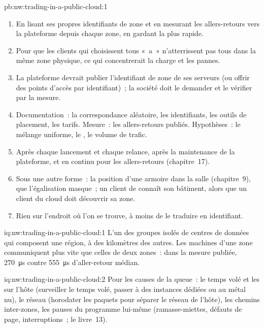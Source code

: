 \begin{solution}{pb:nw:trading-in-a-public-cloud:1}
\begin{enumerate}[resume]
  $(1 - 1/n)(t_c - t_s)$ par aller-retour en moyenne, soit \qty{237.5}{\micro\second} avec six zones et les médianes publiées.
\item En lisant ses propres identifiants de zone et en mesurant les allers-retours vers la plateforme depuis chaque zone, en gardant la plus rapide.
\item Pour que les clients qui choisissent tous «~a~» n'atterrissent pas tous dans la même zone physique, ce qui concentrerait la charge et les pannes.
\item La plateforme devrait publier l'identifiant de zone de ses serveurs (ou offrir des points d'accès par identifiant)~; la société doit le demander et le vérifier par la
  mesure.
\item Documentation~: la correspondance aléatoire, les identifiants, les outils de placement, les tarifs. Mesure~: les allers-retours publiés. Hypothèses~: le
  mélange uniforme, le , le volume de trafic.
\item Après chaque lancement et chaque relance, après la maintenance de la plateforme, et en continu pour les allers-retours (chapitre~17).
\item Sous une autre forme~: la position d'une armoire dans la salle (chapitre~9), que l'égalisation masque~; un client de  connaît son bâtiment, alors que
  un client du cloud doit découvrir sa zone.
\item Rien sur l'endroit où l'on se trouve, à moins de le traduire en identifiant.
\end{enumerate}
\end{solution}

\begin{solution}{iq:nw:trading-in-a-public-cloud:1}
L'un des groupes isolés de centres de données qui composent une région, à des kilomètres des autres. Les machines d'une zone communiquent plus vite que celles de deux zones~:
dans la mesure publiée, \qty{270}{\micro\second} contre \qty{555}{\micro\second} d'aller-retour médian.
\end{solution}

\begin{solution}{iq:nw:trading-in-a-public-cloud:2}
Pour les causes de la queue~: le temps volé et les  sur l'hôte (surveiller le temps volé, passer à des instances dédiées ou au métal nu), le réseau (horodater les paquets pour
séparer le réseau de l'hôte), les chemins inter-zones, les pauses du programme lui-même (ramasse-miettes, défauts de page, interruptions~; le livre~13).
\end{solution}

